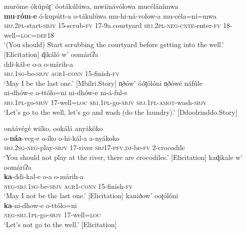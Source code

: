 \documentclass[output=paper,colorlinks=true, citecolor=brown,draftmode]{langscibook}
\begin{document}
\ea\label{ex:cuw:11}
    \ea\label{ex:cuw:11a} muróme ókúpúʈ’ óotákúlúwa, mwiinávólowa mucélánímwa \\
        \gll  \textbf{mu}{}-\textbf{róm}{}-\textbf{e} ó-kupútt-a o-tákulúwa mu-hi-ná-volow-a mu-céla=ní=mwa\\
              \textsc{sbj.2}\textsc{pl}{}-start-\textsc{sbjv} 15-scrub-\textsc{fv} 17-9a.courtyard\textsc{} \textsc{sbj.2pl-neg-cnte}{}-enter-\textsc{fv} 18{}-well=\textsc{loc=def18}\\ 
        \glt ‘(You should) Start scrubbing the courtyard before getting into the well.’ [Elicitation] 
    \ex\label{ex:cuw:11b} ɖikáló w’ oomáríʔa  \\
        \gll ddi-kál-e o-a o-márih-a\\
              \textsc{sbj.1sg}{}-be-\textsc{sbjv} \textsc{agr1-conn} 15-finish-\textsc{fv}\\
        \glt ‘May I be the last one.’ [Mbílri.Story]
    \ex\label{ex:cuw:11c} n̩ðów’ óóʈólóni n̩ðówé náfûle  \\
        \gll ni-dhów-e o-ttólo=ni ni-dhów-e ni-á-ful-e\\
               \textsc{sbj.1}\textsc{pl}{}-go-\textsc{sbjv} 17-well=\textsc{loc} \textsc{sbj.1}\textsc{pl}{}-go-\textsc{sbjv} \textsc{sbj.1}\textsc{pl}{}-\textsc{amot}{}-wash-\textsc{sbjv}\\
        \glt  ‘Let’s go to the well, let’s go and wash (do the laundry).’ [Ddoolrinddo.Story]
    \z
\z 


\ea\label{ex:cuw:12}
    \ea\label{ex:cuw:12a} onáávégé wiíko, ookálá anyákôko  \\ 
        \gll  o-\textbf{náa}{}-veg-e o-íko o-hi-kál-a a-nyákoko\\
              \textsc{sbj.2sg-neg}{}-play-\textsc{sbjv} 17-river \textsc{sbj17}{}-\textsc{pfv.dj}{}-be-\textsc{fv} 2-crocodile\\
        \glt ‘You should not play at the river, there are crocodiles.’ [Elicitation]
    \ex\label{ex:cuw:12b} kaɖikale w’ oomáríʔa  \\
        \gll    \textbf{ka}{}-ddi-kal-e o-a o-márih-a \\
              \textsc{neg-sbj.1sg}{}-be-\textsc{sbjv} \textsc{agr}1-\textsc{conn} 15-finish-\textsc{fv}\\
        \glt ‘May I not be the last one.’ [Elicitation]
    \ex\label{ex:cuw:12c} kaniðow’ ooʈólóni  \\
        \gll   \textbf{ka}{}-ni-dhow-e o-ttólo=ni \\
              \textsc{neg-sbj.1}\textsc{pl}{}-go-\textsc{sbjv} 17-well=\textsc{loc} \\
        \glt  ‘Let’s not go to the well.’ [Elicitation]
    \z
\z 
\end{document}
